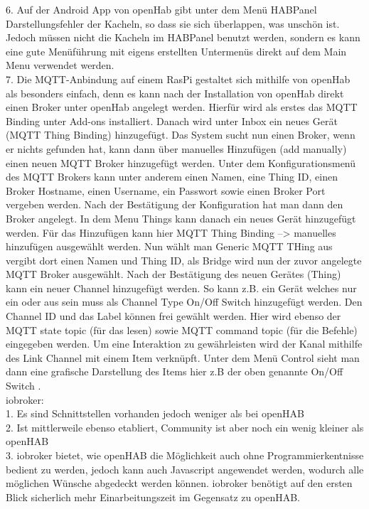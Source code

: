6. Auf der Android App von openHab gibt unter dem Menü HABPanel Darstellungsfehler der Kacheln, so dass sie sich überlappen, was unschön ist. Jedoch müssen nicht die Kacheln im HABPanel benutzt werden, sondern es kann eine gute Menüführung mit eigens erstellten Untermenüs direkt auf dem Main Menu verwendet werden. \\
7. Die MQTT-Anbindung auf einem RasPi gestaltet sich mithilfe von openHab als besonders einfach, denn es kann nach der Installation von openHab direkt einen Broker unter openHab angelegt werden. Hierfür wird als erstes das MQTT Binding unter Add-ons installiert. Danach wird unter Inbox ein neues Gerät (MQTT Thing Binding) hinzugefügt. Das System sucht nun einen Broker, wenn er nichts gefunden hat, kann dann über manuelles Hinzufügen (add manually) einen neuen MQTT Broker hinzugefügt werden. Unter dem Konfigurationsmenü des MQTT Brokers kann unter anderem einen Namen, eine Thing ID, einen Broker Hostname, einen Username, ein Passwort sowie einen Broker Port vergeben werden. Nach der Bestätigung der Konfiguration hat man dann den Broker angelegt. In dem Menu Things kann danach ein neues Gerät hinzugefügt werden. Für das Hinzufügen kann hier MQTT Thing Binding --> manuelles hinzufügen ausgewählt werden. Nun wählt man Generic MQTT THing aus vergibt dort einen Namen und Thing ID, als Bridge wird nun der zuvor angelegte MQTT Broker ausgewählt. Nach der Bestätigung des neuen Gerätes (Thing) kann ein neuer Channel hinzugefügt werden. So kann z.B. ein Gerät welches nur ein oder aus sein muss als Channel Type On/Off Switch hinzugefügt werden. Den Channel ID und das Label können frei gewählt werden. Hier wird ebenso der MQTT state topic (für das lesen) sowie MQTT command topic (für die Befehle) eingegeben werden. Um eine Interaktion zu gewährleisten wird der Kanal mithilfe des Link Channel mit einem Item verknüpft. Unter dem Menü Control sieht man dann eine grafische Darstellung des Items hier z.B der oben genannte On/Off Switch \cite{st33zy_media_mqtt_nodate}.\\
iobroker:\\
1. Es sind Schnittstellen vorhanden jedoch weniger als bei openHAB\\
2. Ist mittlerweile ebenso etabliert, Community ist aber noch ein wenig kleiner als openHAB\\
3. iobroker bietet, wie openHAB die Möglichkeit auch ohne Programmierkentnisse bedient zu werden, jedoch kann auch Javascript angewendet werden, wodurch alle möglichen Wünsche abgedeckt werden können\cite{iobroker_einsteiger_nodate}. iobroker benötigt auf den ersten Blick sicherlich mehr Einarbeitungszeit im Gegensatz zu openHAB.\\
